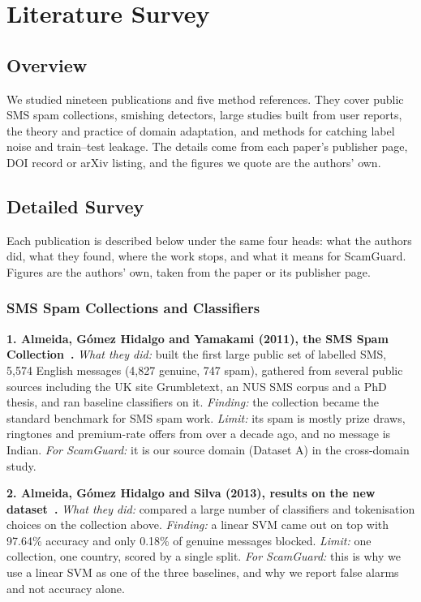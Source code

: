 \chapter{Literature Survey}

\section{Overview}
We studied nineteen publications and five method references. They cover public SMS spam collections, smishing detectors, large studies built from user reports, the theory and practice of domain adaptation, and methods for catching label noise and train--test leakage. The details come from each paper's publisher page, DOI record or arXiv listing, and the figures we quote are the authors' own.

\section{Detailed Survey}
Each publication is described below under the same four heads: what the authors did, what they found, where the work stops, and what it means for ScamGuard. Figures are the authors' own, taken from the paper or its publisher page.

\newcommand{\lit}[2]{\par\needspace{4\baselineskip}\noindent\textbf{#1. #2}}
\newcommand{\hd}[1]{\textit{#1}}

\subsection{SMS Spam Collections and Classifiers}

\lit{1}{Almeida, G\'omez Hidalgo and Yamakami (2011), the SMS Spam Collection~\cite{almeida2011contributions}.} \hd{What they did:} built the first large public set of labelled SMS, 5,574 English messages (4,827 genuine, 747 spam), gathered from several public sources including the UK site Grumbletext, an NUS SMS corpus and a PhD thesis, and ran baseline classifiers on it. \hd{Finding:} the collection became the standard benchmark for SMS spam work. \hd{Limit:} its spam is mostly prize draws, ringtones and premium-rate offers from over a decade ago, and no message is Indian. \hd{For ScamGuard:} it is our source domain (Dataset A) in the cross-domain study.

\lit{2}{Almeida, G\'omez Hidalgo and Silva (2013), results on the new dataset~\cite{almeida2013towards}.} \hd{What they did:} compared a large number of classifiers and tokenisation choices on the collection above. \hd{Finding:} a linear SVM came out on top with 97.64\% accuracy and only 0.18\% of genuine messages blocked. \hd{Limit:} one collection, one country, scored by a single split. \hd{For ScamGuard:} this is why we use a linear SVM as one of the three baselines, and why we report false alarms and not accuracy alone.

